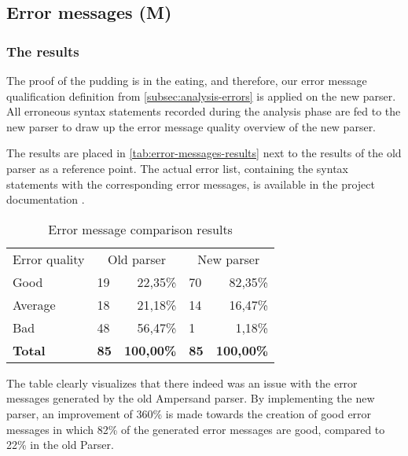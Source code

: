 
\subsection{Error messages  (M)}
\label{results:errors}

\subsubsection{The results}
The proof of the pudding is in the eating, and therefore, our error message qualification definition from \autoref{subsec:analysis-errors} is applied on the new parser.
All erroneous syntax statements recorded during the analysis phase are fed to the new parser to draw up the error message quality overview of the new parser.

The results are placed in \autoref{tab:error-messages-results} next to the results of the old parser as a reference point.
The actual error list, containing the syntax statements with the corresponding error messages, is available in the project documentation .

\begin{table}[h]
  \centering
	\begin{tabular}{llrlr}
    Error quality  & \multicolumn{2}{c}{Old parser} & \multicolumn{2}{c}{New parser} \\
		Good           & 19          & 22,35\%          & 70          & 82,35\%          \\
		Average        & 18          & 21,18\%          & 14          & 16,47\%          \\
		Bad            & 48          & 56,47\%          & 1           &  1,18\%          \\
		\rowcolor[HTML]{BBBBBB}
		\textbf{Total} & \textbf{85} & \textbf{100,00\%} & \textbf{85} & \textbf{100,00\%}
	\end{tabular}
  \caption{Error message comparison results}
  \label{tab:error-messages-results}
\end{table}

The table clearly visualizes that there indeed was an issue with the error messages generated by the old Ampersand parser.
By implementing the new parser, an improvement of 360\% is made towards the creation of good error messages in which 82\% of the generated error messages are good, compared to 22\% in the old Parser.

